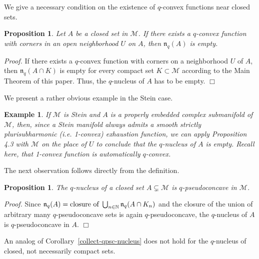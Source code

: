 \documentclass[11pt,a4paper]{article}
\newtheorem{prop}[lem]{Proposition}
\newtheorem{ex}[lem]{Example}
\newenvironment{proof}{\noindent\textit{Proof. }}{\hfill $\Box$\linebreak}
\newcommand{\NN}{\mathbb{N}}
\newcommand{\Mcal}{\mathcal{M}}
\newcommand{\nuc}{\mathfrak{n}}
\begin{document}
We give a necessary condition on the existence of $q$-convex functions near closed sets.

\begin{prop}\label{closed} Let $A$ be a closed set in $\Mcal$. If there exists a $q$-convex function with corners in an open neighborhood $U$ on $A$, then $\nuc_q(A)$ is empty.
\end{prop}

\begin{proof} If there exists a $q$-convex function with corners on a neighborhood $U$ of $A$, then $\nuc_q(A \cap K)$ is empty for every compact set $K \subset \Mcal$ according to the Main Theorem of this paper. Thus, the $q$-nucleus of $A$ has to be empty.
\end{proof}

We present a rather obvious example in the Stein case.

\begin{ex} If $\Mcal$ is Stein and $A$ is a properly embedded complex submanifold of $\Mcal$, then, since a Stein manifold always admits a smooth strictly plurisubharmonic (i.e. 1-convex) exhaustion function, we can apply Proposition 4.3 with $\Mcal$ on the place of $U$ to conclude that the $q$-nucleus of $A$ is empty. Recall here, that 1-convex function is automatically $q$-convex.
\end{ex}

The next observation follows directly from the definition.

\begin{prop} The $q$-nucleus of a closed set $A \subsetneq \Mcal$ is $q$-pseudoconcave in $\Mcal$.
\end{prop}

\begin{proof} Since $\nuc_q(A)= \hbox{closure\ of}\ \bigcup_{n \in \NN} \nuc_q(A \cap K_n)$ and the closure of the union of arbitrary many $q$-pseudoconcave sets is again $q$-pseudoconcave, the $q$-nucleus of $A$ is $q$-pseudoconcave in $A$. 
\end{proof}

An analog of Corollary~\ref{collect-qpsc-nucleus} does not hold for the $q$-nucleus of closed, not necessarily compact sets.
\end{document}
